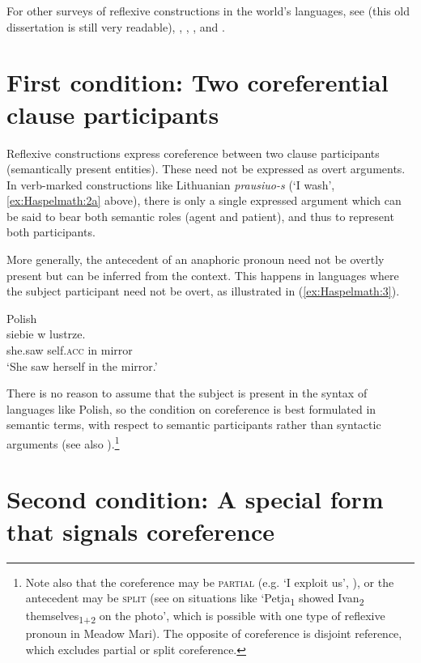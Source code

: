 \documentclass[output=paper]{langscibook}
\begin{document}
  For other surveys of reflexive constructions in the world’s languages, see \citet{Faltz1977} (this old dissertation is still very readable), \citet{Geniusiene1987}, \citet{Huang2000}, \citet[Chapter 22]{Dixon2012}, and \citet{Everaert2013}.

\section{First condition: Two coreferential clause participants}\label{sec:Haspelmath:2}

Reflexive constructions express coreference between two clause participants (semantically present entities). These need not be expressed as overt arguments. In verb-marked constructions like Lithuanian \textit{prausiuo-s} (‘I wash’, \ref{ex:Haspelmath:2a} above), there is only a single expressed argument which can be said to bear both semantic roles (agent and patient), and thus to represent both participants.

  More generally, the antecedent of an anaphoric pronoun need not be overtly present but can be inferred from the context. This happens in languages where the subject participant need not be overt, as illustrated in (\ref{ex:Haspelmath:3}).

\ea Polish
    \label{ex:Haspelmath:3}\\
      {siebie}    {w}  {lustrze.}\\
      she.saw  self.\textsc{acc}  in  mirror  \\
    \glt‘She saw herself in the mirror.’
 \z

There is no reason to assume that the subject is present in the syntax of languages like Polish, so the condition on coreference is best formulated in semantic terms, with respect to semantic participants rather than syntactic arguments (see also \citealt{Jackendoff1992}).\footnote{{Note also that the coreference may be} {\textsc{partial}} {(e.g. ‘I exploit us’, \citealt{HampeLehmann2013}), or the antecedent may be} {\textsc{split}} {(see \citet{Volkova2017} on situations like ‘Petja}{\textsubscript{1}} {showed Ivan}{\textsubscript{2} }{themselves}{\textsubscript{1+2}} {on the photo’, which is possible with one type of reflexive pronoun in Meadow Mari). The opposite of coreference is disjoint reference, which excludes partial or split coreference.}}


\section{Second condition:  A special form that signals coreference}\label{sec:Haspelmath:3}
\end{document}
